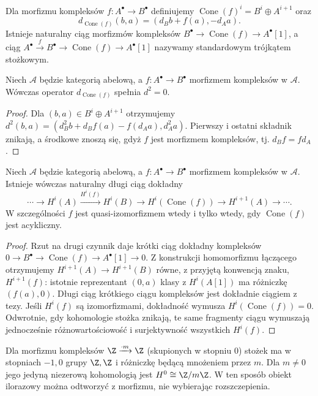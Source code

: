 \begin{definicja}
Dla morfizmu kompleksów $f:A^\bullet\to B^\bullet$
definiujemy $\operatorname{Cone}(f)^i=B^i\oplus A^{i+1}$ oraz
\[
d_{\operatorname{Cone}(f)}(b,a)=(d_Bb+f(a),-d_Aa).
\]
Istnieje naturalny ciąg morfizmów kompleksów
$B^\bullet\to\operatorname{Cone}(f)\to A^\bullet[1]$,
a ciąg $A^\bullet\xrightarrow f B^\bullet\to
\operatorname{Cone}(f)\to A^\bullet[1]$
nazywamy standardowym trójkątem stożkowym.
\end{definicja}
\begin{lemat}
\label{lem:cone-complex-xiv}
Niech $\mathcal A$ będzie kategorią abelową,
a $f:A^\bullet\to B^\bullet$ morfizmem kompleksów
w $\mathcal A$. Wówczas operator
$d_{\operatorname{Cone}(f)}$ spełnia $d^2=0$.
\end{lemat}
\begin{proof}
Dla $(b,a)\in B^i\oplus A^{i+1}$ otrzymujemy
$d^2(b,a)=(d_B^2b+d_Bf(a)-f(d_Aa),d_A^2a)$.
Pierwszy i ostatni składnik znikają, a środkowe znoszą się,
gdyż $f$ jest morfizmem kompleksów, tj. $d_Bf=fd_A$.
\end{proof}

\begin{twierdzenie}
\label{thm:cone-les-xiv}
Niech $\mathcal A$ będzie kategorią abelową,
a $f:A^\bullet\to B^\bullet$ morfizmem kompleksów
w $\mathcal A$. Istnieje wówczas naturalny długi
ciąg dokładny
\[
\cdots\to H^i(A)\xrightarrow{H^i(f)}H^i(B)
\to H^i(\operatorname{Cone}(f))\to H^{i+1}(A)\to\cdots.
\]
W szczególności $f$ jest quasi-izomorfizmem wtedy i tylko wtedy,
gdy $\operatorname{Cone}(f)$ jest acykliczny.
\end{twierdzenie}
\begin{proof}
Rzut na drugi czynnik daje krótki ciąg dokładny kompleksów
$0\to B^\bullet\to\operatorname{Cone}(f)\to A^\bullet[1]\to0$.
Z konstrukcji homomorfizmu łączącego otrzymujemy
$H^{i+1}(A)\to H^{i+1}(B)$ równe, z przyjętą konwencją
znaku, $H^{i+1}(f)$: istotnie reprezentant $(0,a)$
klasy z $H^i(A[1])$ ma różniczkę $(f(a),0)$.
Długi ciąg krótkiego ciągu kompleksów jest dokładnie
ciągiem z tezy. Jeśli $H^i(f)$ są izomorfizmami,
dokładność wymusza $H^i(\operatorname{Cone}(f))=0$.
Odwrotnie, gdy kohomologie stożka znikają, te same
fragmenty ciągu wymuszają jednocześnie różnowartościowość
i surjektywność wszystkich $H^i(f)$.
\end{proof}

\begin{przyklad}
Dla morfizmu kompleksów $\Z\xrightarrow{\cdot m}\Z$
(skupionych w stopniu $0$) stożek ma w stopniach
$-1,0$ grupy $\Z,\Z$ i różniczkę będącą mnożeniem
przez $m$. Dla $m\neq0$ jego jedyną niezerową kohomologią
jest $H^0\cong\Z/m\Z$. W ten sposób obiekt ilorazowy
można odtworzyć z morfizmu, nie wybierając rozszczepienia.
\end{przyklad}

